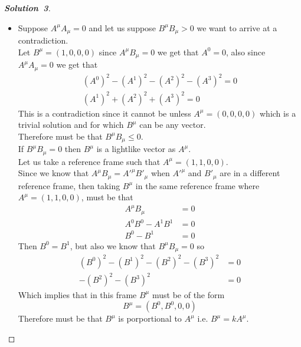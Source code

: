 \documentclass[11pt]{article}
\theoremstyle{definition}
\renewcommand*{\proofname}{\bf{Solution}}
\begin{document}
\begin{proof}[\proofname\ 3]
\begin{itemize}
\cleardoublepage
\item [(b)] Suppose $A^\mu A_\mu = 0$ and let us suppose $B^\mu B_{\mu} > 0$
we want to arrive at a contradiction.\\
Let $B^\mu = (1, 0, 0, 0)$ since $A^\mu B_{\mu} = 0$ we get that $A^0 = 0$, 
also since $A^\mu A_\mu = 0$ we get that
\begin{align*}
    (A^0)^2 - (A^1)^2 - (A^2)^2 - (A^3)^2 = 0 \\
    (A^1)^2 + (A^2)^2 + (A^3)^2 = 0
\end{align*}
This is a contradiction since it cannot be unless $A^\mu = (0,0,0,0)$ which is
a trivial solution and for which $B^\mu$ can be any vector. \\
Therefore must be that $B^\mu B_\mu \leq 0$.\\
If $B^\mu B_\mu = 0$ then $B^\mu$ is a lightlike vector as $A^\mu$. \\
Let us take a reference frame such that $A^{\mu} = (1,1,0,0)$.\\
Since we know that $A^\mu B_\mu = A'^\mu B'_\mu$ when $A'^\mu$
and $B'_\mu$ are in a different reference frame, then taking $B^\mu$ in the
same reference frame where $A^{\mu} = (1,1,0,0)$, must be that 
\begin{align*}
    A^\mu B_\mu &= 0 \\
    A^0B^0 - A^1B^1 &= 0 \\
    B^0 - B^1 &= 0
\end{align*}
Then $B^0 = B^1$, but also we know that $B^\mu B_\mu = 0$ so
\begin{align*}
    (B^0)^2 - (B^1)^2 - (B^2)^2 - (B^3)^2 &= 0 \\
    - (B^2)^2 - (B^3)^2 &= 0
\end{align*}
Which implies that in this frame $B^\mu$ must be of the form 
$$B^\mu = (B^0, B^0, 0, 0)$$
Therefore must be that $B^\mu$ is porportional to $A^\mu$ i.e. $B^\mu = kA^\mu$.
\end{itemize}
\end{proof}
\end{document}
